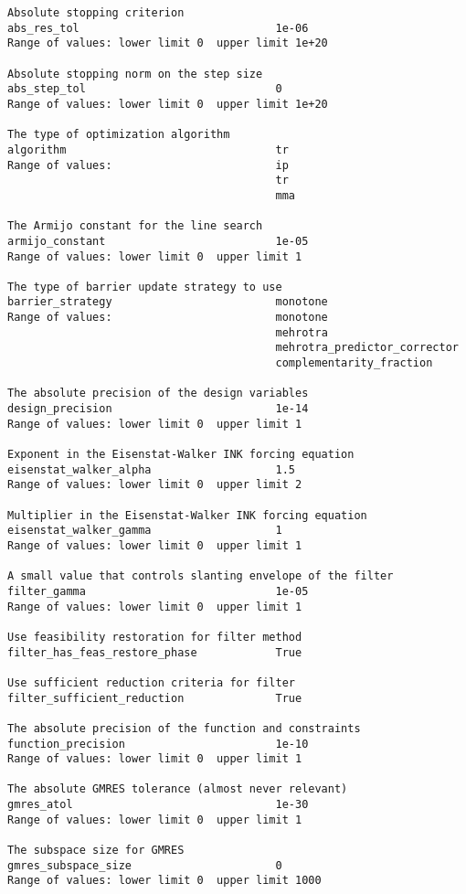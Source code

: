 \documentclass[12pt]{article}
\begin{document}
{\footnotesize
\begin{verbatim}
Absolute stopping criterion
abs_res_tol                              1e-06
Range of values: lower limit 0  upper limit 1e+20

Absolute stopping norm on the step size
abs_step_tol                             0
Range of values: lower limit 0  upper limit 1e+20

The type of optimization algorithm
algorithm                                tr
Range of values:                         ip
                                         tr
                                         mma

The Armijo constant for the line search
armijo_constant                          1e-05
Range of values: lower limit 0  upper limit 1

The type of barrier update strategy to use
barrier_strategy                         monotone
Range of values:                         monotone
                                         mehrotra
                                         mehrotra_predictor_corrector
                                         complementarity_fraction

The absolute precision of the design variables
design_precision                         1e-14
Range of values: lower limit 0  upper limit 1

Exponent in the Eisenstat-Walker INK forcing equation
eisenstat_walker_alpha                   1.5
Range of values: lower limit 0  upper limit 2

Multiplier in the Eisenstat-Walker INK forcing equation
eisenstat_walker_gamma                   1
Range of values: lower limit 0  upper limit 1

A small value that controls slanting envelope of the filter
filter_gamma                             1e-05
Range of values: lower limit 0  upper limit 1

Use feasibility restoration for filter method
filter_has_feas_restore_phase            True

Use sufficient reduction criteria for filter
filter_sufficient_reduction              True

The absolute precision of the function and constraints
function_precision                       1e-10
Range of values: lower limit 0  upper limit 1

The absolute GMRES tolerance (almost never relevant)
gmres_atol                               1e-30
Range of values: lower limit 0  upper limit 1

The subspace size for GMRES
gmres_subspace_size                      0
Range of values: lower limit 0  upper limit 1000


\end{verbatim}}
\end{document}
